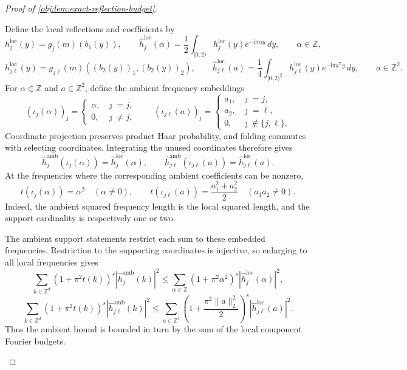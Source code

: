 \documentclass[11pt]{article}
\begin{document}
\begin{proof}[Proof of \cref{obj:lem:exact-reflection-budget}]
\begin{enumerate}
Define the local reflections and coefficients by
\[
h_j^{\mathrm{loc}}(y)
=
g_j(m)(b_1(y)),
\qquad
\widehat h_j^{\mathrm{loc}}(\alpha)
=
\frac12\int_{[0,2)}
h_j^{\mathrm{loc}}(y)e^{-\mathrm i\pi\alpha y}\,dy,
\qquad \alpha\in\mathbb Z,
\]
\[
h_{j\ell}^{\mathrm{loc}}(y)
=
g_{j\ell}(m)((b_2(y))_1,(b_2(y))_2),
\qquad
\widehat h_{j\ell}^{\mathrm{loc}}(a)
=
\frac14\int_{[0,2)^2}
h_{j\ell}^{\mathrm{loc}}(y)e^{-\mathrm i\pi a^{\mathsf T}y}\,dy,
\qquad a\in\mathbb Z^2.
\]
For \(\alpha\in\mathbb Z\) and \(a\in\mathbb Z^2\), define the ambient frequency embeddings
\[
(\iota_j(\alpha))_\jmath
=
\begin{cases}
\alpha,&\jmath=j,\\
0,&\jmath\neq j,
\end{cases}
\qquad
(\iota_{j\ell}(a))_\jmath
=
\begin{cases}
a_1,&\jmath=j,\\
a_2,&\jmath=\ell,\\
0,&\jmath\notin\{j,\ell\}.
\end{cases}
\]
Coordinate projection preserves product Haar probability, and folding commutes with selecting coordinates. Integrating the unused coordinates therefore gives
\[
\widehat h_j^{\mathrm{amb}}(\iota_j(\alpha))
=
\widehat h_j^{\mathrm{loc}}(\alpha),
\qquad
\widehat h_{j\ell}^{\mathrm{amb}}(\iota_{j\ell}(a))
=
\widehat h_{j\ell}^{\mathrm{loc}}(a).
\]
At the frequencies where the corresponding ambient coefficients can be nonzero,
\[
t(\iota_j(\alpha))=\alpha^2
\quad(\alpha\neq0),
\qquad
t(\iota_{j\ell}(a))=\frac{a_1^2+a_2^2}{2}
\quad(a_1a_2\neq0).
\]
Indeed, the ambient squared frequency length is the local squared length, and the support cardinality is respectively one or two.

The ambient support statements restrict each sum to these embedded frequencies. Restriction to the supporting coordinates is injective, so enlarging to all local frequencies gives
\[
\sum_{k\in\mathbb Z^d}
(1+\pi^2t(k))^s|\widehat h_j^{\mathrm{amb}}(k)|^2
\leq
\sum_{\alpha\in\mathbb Z}
(1+\pi^2\alpha^2)^s|\widehat h_j^{\mathrm{loc}}(\alpha)|^2,
\]
\[
\sum_{k\in\mathbb Z^d}
(1+\pi^2t(k))^s|\widehat h_{j\ell}^{\mathrm{amb}}(k)|^2
\leq
\sum_{a\in\mathbb Z^2}
\left(1+\frac{\pi^2\|a\|_2^2}{2}\right)^s
|\widehat h_{j\ell}^{\mathrm{loc}}(a)|^2.
\]
Thus the ambient bound is bounded in turn by the sum of the local component Fourier budgets.


\end{enumerate}
\end{proof}
\end{document}
